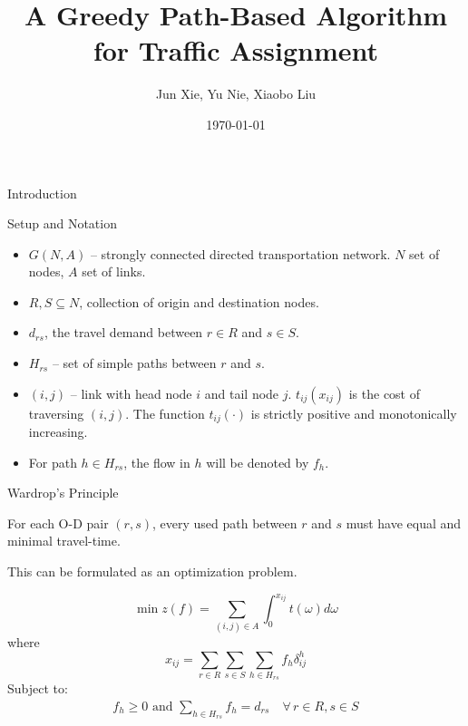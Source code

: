 \documentclass{beamer}
\title{A Greedy Path-Based Algorithm for Traffic Assignment}
\author{Jun Xie, Yu Nie, Xiaobo Liu}
\date{\today}
\begin{document}
\begin{frame}
    \titlepage
\end{frame}

\begin{frame}{Introduction}
\end{frame}

\begin{frame}{Setup and Notation}
\begin{itemize}
    \item $G(N,A)$ -- strongly connected directed transportation network.
    $N$ set of nodes, $A$ set of links.

    \item $R, S\subseteq N$, collection of origin and destination nodes.

    \item $d_{rs}$, the travel demand between $r\in R$ and $s\in S$.

    \item $H_{rs}$ -- set of simple paths between $r$ and $s$.

    \item $(i,j)$ -- link with head node $i$ and tail node $j$.
    $t_{ij}(x_{ij})$ is the cost of traversing $(i,j)$. The
    function $t_{ij}(\cdot)$ is strictly positive and monotonically
    increasing.

    \item For path $h\in H_{rs}$, the flow in $h$ will be
    denoted by $f_h$.
\end{itemize}
\end{frame}

\begin{frame}{Wardrop's Principle}
\begin{definition}[UE-Condition]
    For each O-D pair $(r,s)$, every used path between $r$ and
    $s$ must have equal and minimal travel-time.
\end{definition}

This can be formulated as an optimization problem.

\[
    \min z(f) = \sum_{(i,j)\in A} \int_0^{
    x_{ij}
    } t(\omega)d\omega
\]
where
\[
    x_{ij} = \sum_{r\in R}\sum_{s\in S}\sum_{h\in H_{rs}}f_h
    \delta_{ij}^h
\]
Subject to:
\[
\begin{split}
    f_h\geq 0 \text{ and }\sum_{h\in H_{rs}} f_h = d_{rs}\quad \forall\, r\in R,s\in S
\end{split}
\]
\end{frame}
\end{document}
